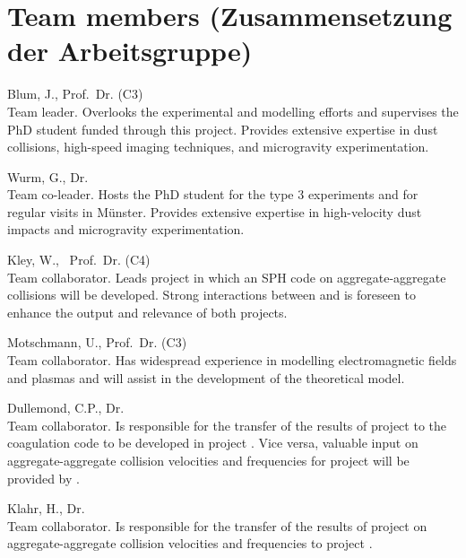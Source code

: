 \section{\label{persb1}Team members (Zusammensetzung der Arbeitsgruppe)}
%
%
\begin{teamlist}

\item[Blum, J., Prof.~Dr. (C3)]\mbox{}\\
Team leader. Overlooks the experimental and modelling efforts and
supervises the PhD student funded through this project. Provides
extensive expertise in dust collisions, high-speed imaging
techniques, and microgravity experimentation.

\item[Wurm, G., Dr.]\mbox{}\\
Team co-leader. Hosts the PhD student for the type 3 experiments
and for regular visits in M\"unster. Provides extensive expertise
in high-velocity dust impacts and microgravity experimentation.

\item[Kley, W., ~Prof.~Dr. (C4)]\mbox{}\\
Team collaborator. Leads project \projkley{} in which an SPH code
on aggregate-aggregate collisions will be developed. Strong
interactions between \projkley{} and \projblum{} is foreseen to
enhance the output and relevance of both projects.

\item[Motschmann, U., Prof.~Dr. (C3)]\mbox{}\\
Team collaborator. Has widespread experience in modelling
electromagnetic fields and plasmas and will assist in the
development of the theoretical model.

\item[Dullemond, C.P., Dr.]\mbox{}\\
Team collaborator. Is responsible for the transfer of the results
of project \projblum{} to the coagulation code to be developed in
project \projdul{}. Vice versa, valuable input on
aggregate-aggregate collision velocities and frequencies for
project \projblum{} will be provided by \projdul{}.

\item[Klahr, H., Dr.]\mbox{}\\
Team collaborator. Is responsible for the transfer of the results
of project \projklahr{} on aggregate-aggregate collision
velocities and frequencies to project \projblum{}.


\end{teamlist}
